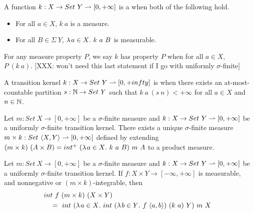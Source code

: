 \begin{definition}
\label{def:transition-kernel}
A function $k : X \to Set~Y \rightharpoonup [0,+\infty]$ is a  when both of the following hold.
\begin{itemize}
	\item For all $a \in X$, $k~a$ is a measure.
	\item For all $B \in \Sigma~Y$, $\lambda\mspace{2mu}{a \in X}\ldotp\, k~a~B$ is measurable.
\end{itemize}
For any measure property $P$, we say $k$ has property $P$ when for all $a \in X$, $P~(k~a)$. [XXX: won't need this last statement if I go with uniformly $\sigma$-finite]
\end{definition}

\begin{definition}
A transition kernel $k : X \to Set~Y \rightharpoonup [0,+infty]$ is  when there exists an at-most-countable partition $s : \mathbb{N} \to Set~Y$ such that $k~a~(s~n) < +\infty$ for all $a \in X$ and $n \in \mathbb{N}$.
\end{definition}

\begin{lemma}
\label{lem:finite-transition-kernel-products}
Let $m : Set~X \to [0,+\infty]$ be a $\sigma$-finite measure and $k : X \to Set~Y \rightharpoonup [0,+\infty]$ be a uniformly $\sigma$-finite transition kernel.
There exists a unique $\sigma$-finite measure $m \times k : Set~\langle{X,Y}\rangle \rightharpoonup [0,+\infty]$ defined by extending $(m \times k)~(A \times B) = int^+~(\lambda\mspace{2mu}{a \in X}\ldotp\, k~a~B)~m~A$ to a product measure.
\end{lemma}

\begin{lemma}
\label{lem:fubini-for-transition-kernels}
Let $m : Set~X \to [0,+\infty]$ be a $\sigma$-finite measure and $k : X \to Set~Y \rightharpoonup [0,+\infty]$ be a uniformly $\sigma$-finite transition kernel. If $f : X \times Y \to [-\infty,+\infty]$ is measurable, and nonnegative or $(m \times k)$-integrable, then
\begin{equation}
\begin{aligned}
	&int~f~(m \times k)~(X \times Y)
\\
	&\tab =\ 
	int~(\fun{a \in X} int~(\fun{b \in Y} f~\pair{a,b})~(k~a)~Y)~m~X
\end{aligned}
\end{equation}
\end{lemma}


